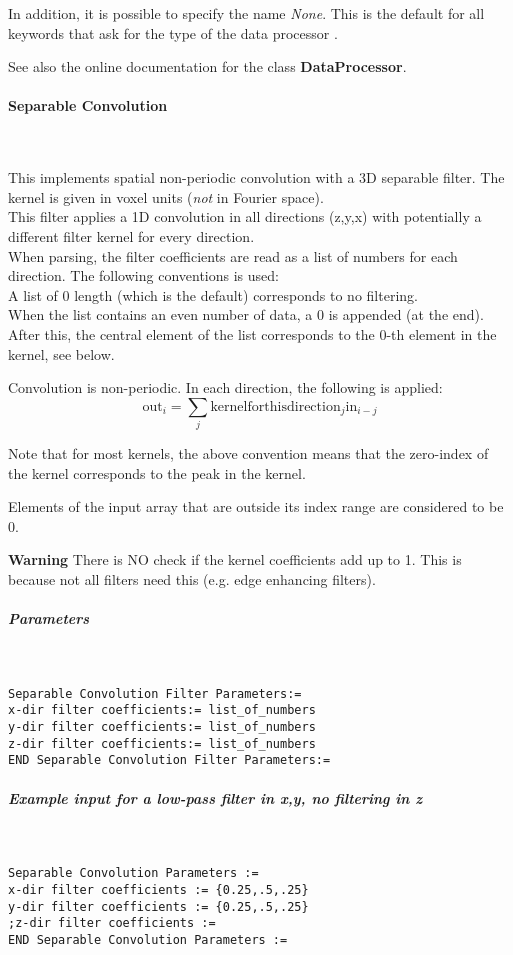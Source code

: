 \documentclass{article}
\newcommand{\tab}{\hspace{5mm}}
\newcommand{\subsubsubsection}[1]{\paragraph{#1}\mbox{} \\}
\newcommand{\subsubsubsubsection}[1]{\subparagraph{#1} \mbox{} \\}
\begin{document}
{{{In addition, it is possible to specify the name \textit{None}. This 
is the default for all keywords that ask for the type of 
the data processor .


See also the online documentation for the class \textbf{DataProcessor}.

{ \subsubsubsection{Separable Convolution}
}
This implements spatial non-periodic convolution with a 3D separable 
filter. The kernel is given in voxel units (\textit{not} in Fourier 
space).\\
This filter applies a 1D convolution in all directions (z,y,x) 
with potentially a different filter kernel for every direction.\\
When parsing, the filter coefficients are read as a list of numbers 
for each direction. The following conventions is used:\\
{\textbullet}\tab 
A list of 0 length (which is the default) corresponds to no filtering.\\
{\textbullet}\tab When the list contains an even number of data, a 0 is 
appended (at the end).\\
{\textbullet}\tab 
After this, the central element of the list corresponds to the 
0-th element in the kernel, see below.


Convolution is non-periodic. In each direction, the following 
is applied: 
\[
\mathrm{out}_i = \sum_{j} \mathrm{kernelforthisdirection}_{j} \mathrm{in}_{i-j}
\]

Note that for most kernels, the above convention means that the 
zero-index of the kernel corresponds to the peak in the kernel. 



Elements of the input array that are outside its index range 
are considered to be 0. 


\textbf{Warning} There is NO check if the kernel coefficients add 
up to 1. This is because not all filters need this (e.g. edge 
enhancing filters).

{ \subsubsubsubsection{Parameters}
}
\begin{verbatim}
Separable Convolution Filter Parameters:=
x-dir filter coefficients:= list_of_numbers
y-dir filter coefficients:= list_of_numbers
z-dir filter coefficients:= list_of_numbers
END Separable Convolution Filter Parameters:=
\end{verbatim}

{ \subsubsubsubsection{Example input for a low-pass filter in x,y, no filtering 
in z}
}
\begin{verbatim}
Separable Convolution Parameters := 
x-dir filter coefficients := {0.25,.5,.25} 
y-dir filter coefficients := {0.25,.5,.25} 
;z-dir filter coefficients :=
END Separable Convolution Parameters :=
\end{verbatim}

}}}
\end{document}
